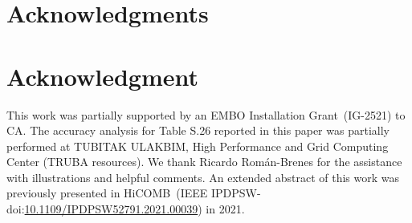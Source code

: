 \ifCLASSOPTIONcompsoc
  \section*{Acknowledgments}
\else
  \section*{Acknowledgment}
\fi

This work was partially supported by an EMBO Installation Grant~(IG-2521) to CA. The accuracy analysis for Table S.26 reported in this paper was partially performed at TUBITAK ULAKBIM, High Performance and Grid Computing Center (TRUBA resources). We thank Ricardo Román-Brenes for the assistance with illustrations and helpful comments. An extended abstract of this work was previously presented in HiCOMB~(IEEE IPDPSW-doi:\href{https://doi.org/10.1109/IPDPSW52791.2021.00039}{10.1109/IPDPSW52791.2021.00039}) in 2021. 